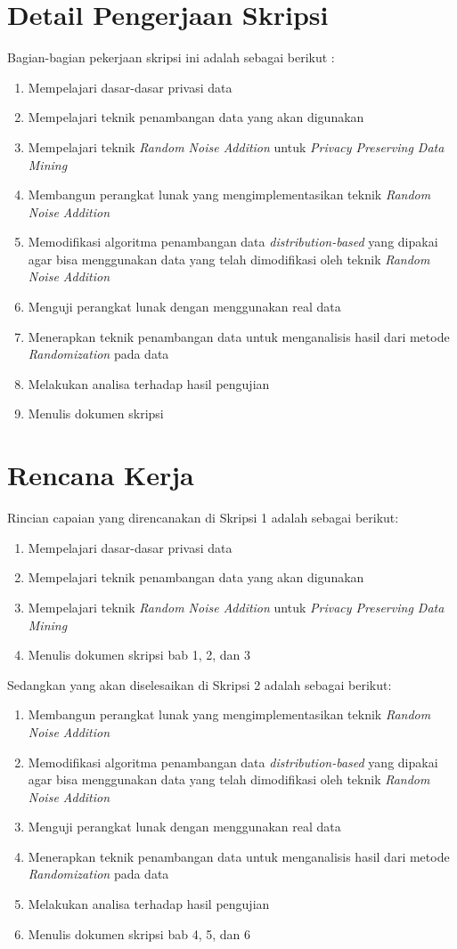 \documentclass[a4paper,twoside]{article}
\begin{document}
\section{Detail Pengerjaan Skripsi}
Bagian-bagian pekerjaan skripsi ini adalah sebagai berikut :
	\begin{enumerate}
		\item Mempelajari dasar-dasar privasi data
		\item Mempelajari teknik penambangan data yang akan digunakan
		\item Mempelajari teknik \textit{Random Noise Addition} untuk \textit{Privacy Preserving Data Mining}
		\item Membangun perangkat lunak yang mengimplementasikan teknik \textit{Random Noise Addition}
		\item Memodifikasi algoritma penambangan data \textit{distribution-based} yang dipakai agar bisa menggunakan data yang telah dimodifikasi oleh teknik \textit{Random Noise Addition} 
		\item Menguji perangkat lunak dengan menggunakan real data
		\item Menerapkan teknik penambangan data untuk menganalisis hasil dari metode \textit{Randomization} pada data
		\item Melakukan analisa terhadap hasil pengujian
		\item Menulis dokumen skripsi
	\end{enumerate}

\section{Rencana Kerja}
Rincian capaian yang direncanakan di Skripsi 1 adalah sebagai berikut:
\begin{enumerate}
	\item Mempelajari dasar-dasar privasi data
	\item Mempelajari teknik penambangan data yang akan digunakan
	\item Mempelajari teknik \textit{Random Noise Addition} untuk \textit{Privacy Preserving Data Mining}
	\item Menulis dokumen skripsi bab 1, 2, dan 3
\end{enumerate}

Sedangkan yang akan diselesaikan di Skripsi 2 adalah sebagai berikut:
\begin{enumerate}
	\item Membangun perangkat lunak yang mengimplementasikan teknik \textit{Random Noise Addition}
	\item Memodifikasi algoritma penambangan data \textit{distribution-based} yang dipakai agar bisa menggunakan data yang telah dimodifikasi oleh teknik \textit{Random Noise Addition} 
	\item Menguji perangkat lunak dengan menggunakan real data
	\item Menerapkan teknik penambangan data untuk menganalisis hasil dari metode \textit{Randomization} pada data
	\item Melakukan analisa terhadap hasil pengujian
	\item Menulis dokumen skripsi bab 4, 5, dan 6
\end{enumerate}
\end{document}
